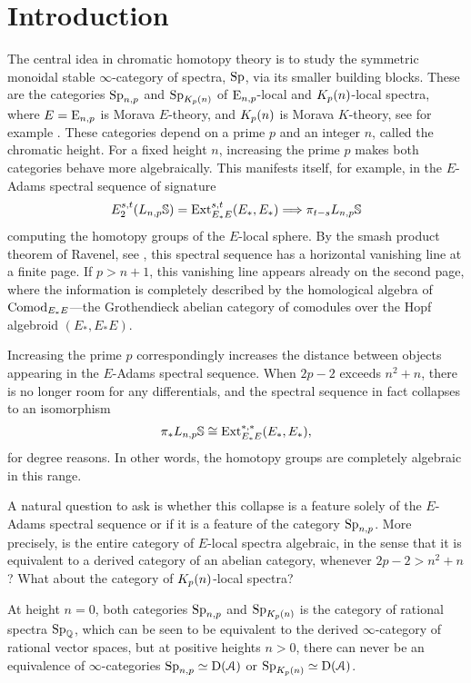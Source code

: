 

\section{Introduction}
\label{ch1:sec:introduction}

The central idea in chromatic homotopy theory is to study the symmetric monoidal stable $\infty$-category of spectra, $\mathrm{Sp}$, via its smaller building blocks. These are the categories $\mathrm{Sp}_{n,p}$ and $\mathrm{Sp}_{{K_p(n)}}$ of ${\mathrm{E}_{n,p}}$-local and ${K_p(n)}$-local spectra, where $E={\mathrm{E}_{n,p}}$ is Morava $E$-theory, and ${K_p(n)}$ is Morava $K$-theory, see for example \cite{hovey-strickland_99}. These categories depend on a prime $p$ and an integer $n$, called the chromatic height. For a fixed height $n$, increasing the prime $p$ makes both categories behave more algebraically. This manifests itself, for example, in the $E$-Adams spectral sequence of signature
\[E^{s,t}_2 (L_{n,p}\mathbb{S}) = \operatorname{Ext}_{E_*E}^{s,t}(E_*,E_*)\Longrightarrow \pi_{t-s} L_{n,p}\mathbb{S}\]
computing the homotopy groups of the $E$-local sphere. By the smash product theorem of Ravenel, see \cite[7.5.6]{ravenel_92}, this spectral sequence has a horizontal vanishing line at a finite page. If $p>n+1$, this vanishing line appears already on the second page, where the information is completely described by the homological algebra of $\mathrm{Comod}_{E_*E}$---the Grothendieck abelian category of comodules over the Hopf algebroid $(E_*, E_*E)$. 

Increasing the prime $p$ correspondingly increases the distance between objects appearing in the $E$-Adams spectral sequence. When $2p-2$ exceeds $n^2+n$, there is no longer room for any differentials, and the  spectral sequence in fact collapses to an isomorphism
\[\pi_* L_{n,p}\mathbb{S}\cong \operatorname{Ext}^{*,*}_{E_*E}(E_*, E_*),\]
for degree reasons. In other words, the homotopy groups are completely algebraic in this range. 

A natural question to ask is whether this collapse is a feature solely of the $E$-Adams spectral sequence or if it is a feature of the category $\mathrm{Sp}_{n,p}$. More precisely, is the entire category of $E$-local spectra algebraic, in the sense that it is equivalent to a derived category of an abelian category, whenever $2p-2>n^2+n$? What about the category of ${K_p(n)}$-local spectra?

At height $n=0$, both categories $\mathrm{Sp}_{n,p}$ and $\mathrm{Sp}_{{K_p(n)}}$ is the category of rational spectra $\mathrm{Sp}_{\mathbb{Q}}$, which can be seen to be equivalent to the derived $\infty$-category of rational vector spaces, but at positive heights $n>0$, there can never be an equivalence of $\infty$-categories $\mathrm{Sp}_{n,p} \simeq \mathrm{D}(\EuScript{A})$ or $\mathrm{Sp}_{{K_p(n)}} \simeq \mathrm{D}(\EuScript{A})$. 

